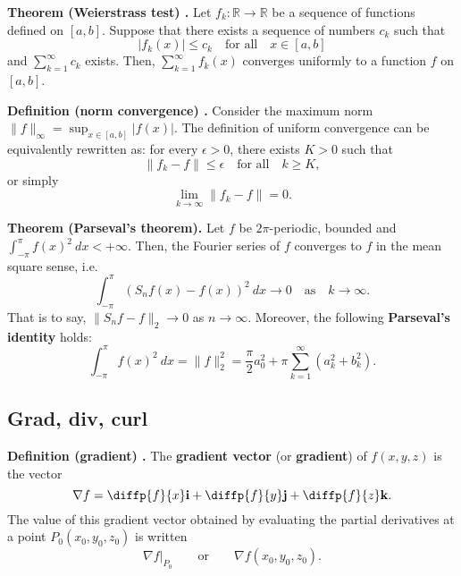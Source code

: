 \begin{shaded}
\textbf{Theorem (Weierstrass test) \cite{math2111_notes}.} Let $f_k : \mathbb{R} \to \mathbb{R}$ be a sequence of functions defined on $[a, b]$. Suppose that there exists a sequence of numbers $c_k$ such that
$$ |f_k(x)| \leq c_k \quad \text{for all} \quad x \in [a, b] $$
and $\sum_{k = 1}^\infty c_k$ exists. Then, $\sum_{k = 1}^\infty f_k(x)$ converges uniformly to a function $f$ on $[a, b]$.
\end{shaded}

\begin{shaded}
\textbf{Definition (norm convergence) \cite{math2111_notes}.} Consider the maximum norm $\lVert f \rVert_\infty = \sup_{x \in [a, b]} |f(x)|$. The definition of uniform convergence can be equivalently rewritten as: for every $\epsilon > 0$, there exists $K > 0$ such that
$$ \lVert f_k - f \rVert \leq \epsilon \quad \text{for all} \quad k \geq K , $$
or simply
$$ \lim_{k \to \infty} \lVert f_k - f \rVert = 0 . $$
\end{shaded}

\begin{shaded}
\textbf{Theorem (Parseval's theorem).} Let $f$ be $2 \pi$-periodic, bounded and $\int_{-\pi}^\pi f(x)^2 \ dx < + \infty$. Then, the Fourier series of $f$ converges to $f$ in the mean square sense, i.e.
$$ \int_{- \pi}^\pi (S_n f(x) - f(x))^2 \ dx \to 0 \quad \text{as} \quad k \to \infty . $$
That is to say, $\lVert S_n f - f \rVert_2 \to 0$ as $n \to \infty$. Moreover, the following \textbf{Parseval's identity} holds:
$$ \int_{-\pi}^\pi f(x)^2 \ dx = \lVert f \rVert_2^2 = \frac{\pi}{2} a_0^2 + \pi \sum_{k = 1}^{\infty} (a_k^2 + b_k^2) . $$
\end{shaded}

\subsection{Grad, div, curl}

\begin{shaded}
\textbf{Definition (gradient) \cite{thomas_calculus}.} The \textbf{gradient vector} (or \textbf{gradient}) of $f(x, y, z)$ is the vector
$$ \nabla f = \diffp{f}{x} \mathbf{i} + \diffp{f}{y} \mathbf{j} + \diffp{f}{z} \mathbf{k} . $$
The value of this gradient vector obtained by evaluating the partial derivatives at a point $P_0(x_0, y_0, z_0)$ is written
$$ \nabla f |_{P_0} \qquad \text{or} \qquad \nabla f(x_0, y_0, z_0) . $$
\end{shaded}

